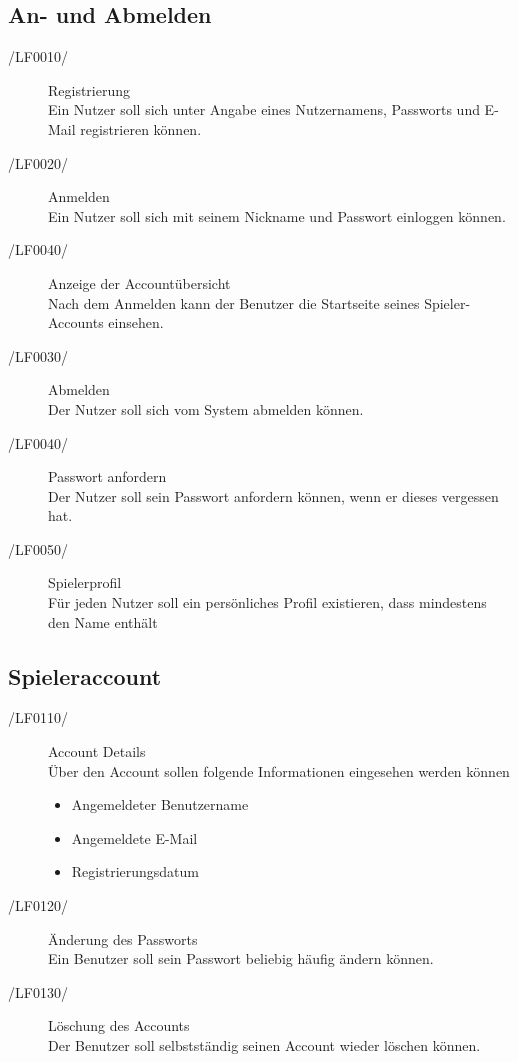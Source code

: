 \documentclass[11pt,a4paper]{scrreprt}
\begin{document}
\subsection{An- und Abmelden}
\begin{description}
\item[/LF0010/] Registrierung \\
Ein Nutzer soll sich unter Angabe eines Nutzernamens, Passworts und E-Mail registrieren können.
\item[/LF0020/] Anmelden \\
Ein Nutzer soll sich mit seinem Nickname und Passwort einloggen können.
\item[/LF0040/] Anzeige der Accountübersicht \\
Nach dem Anmelden kann der Benutzer die Startseite seines Spieler-Accounts einsehen. %
\item[/LF0030/] Abmelden \\
Der Nutzer soll sich vom System abmelden können.
\item[/LF0040/] Passwort anfordern \\
Der Nutzer soll sein Passwort anfordern können, wenn er dieses vergessen hat.

\item[/LF0050/] Spielerprofil \\
Für jeden Nutzer soll ein persönliches Profil existieren, dass mindestens den Name enthält
\end{description}

\subsection{Spieleraccount}
\begin{description}
\item[/LF0110/] Account Details \\
Über den Account sollen folgende Informationen eingesehen werden können
	\begin{itemize}
	\item Angemeldeter Benutzername
	\item Angemeldete E-Mail
	\item Registrierungsdatum
	\end{itemize}
\item[/LF0120/] Änderung des Passworts \\
Ein Benutzer soll sein Passwort beliebig häufig ändern können.
\item[/LF0130/] Löschung des Accounts \\
Der Benutzer soll selbstständig seinen Account wieder löschen können.
\end{description}
\end{document}
